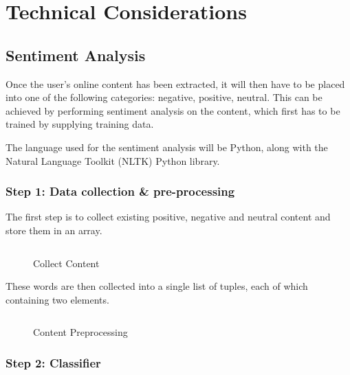 \section{Technical Considerations}

\subsection{Sentiment Analysis}

Once the user's online content has been extracted, it will then have to be placed into one of the following categories: negative, positive, neutral. This can be achieved by performing sentiment analysis on the content, which first has to be trained by supplying training data.

The language used for the sentiment analysis will be Python, along with the Natural Language Toolkit (NLTK) Python library.

\subsubsection{Step 1: Data collection \& pre-processing}

The first step is to collect existing positive, negative and neutral content and store them in an array.

\begin{figure}
  \centering
  \begin{minipage}{14cm}
    \centering
    \inputminted[fontsize=\footnotesize]{python}{inc/snippets/collection.py}
    \caption{Collect Content}
    \label{fig:sentiment_analysis_step1a}
  \end{minipage}
\end{figure}

These words are then collected into a single list of tuples, each of which containing two elements.

\begin{figure}
  \centering
  \begin{minipage}{14cm}
    \centering
    \inputminted[fontsize=\footnotesize]{python}{inc/snippets/collection_iteration.py}
    \caption{Content Preprocessing}
    \label{fig:sentiment_analysis_step1b}
  \end{minipage}
\end{figure}

\subsubsection{Step 2: Classifier}

